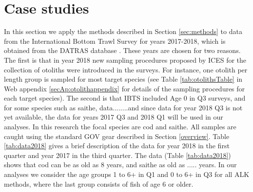 \documentclass[a4paper 12pt]{article}
\numberwithin{equation}{section}
\begin{document}
\section{Case studies}
\label{sec:data}
In this section we apply the methods described in Section \ref{sec:methods} to data from the International Bottom Trawl Survey for years 2017-2018, which is obtained from the DATRAS database \citep{datras}. These years are chosen for two reasons. The first is that in year 2018 new sampling procedures proposed by ICES for the collection of otoliths were introduced in the surveys. For instance, one otolith per length group is sampled for most target species (see Table \ref{tab:otolithsTable} in Web appendix \ref{secAp:otolithappendix} for details of the sampling procedures for each target species). The second is that IBTS included Age 0 in Q3 surveys, and for some species such as saithe, data........and since data for year 2018 Q3 is not yet available, the data for years 2017 Q3 and 2018 Q1 will be used in our analyses. In this research the focal species are cod and saithe. All samples are caught using the standard GOV gear described in Section \ref{overview}. Table \ref{tab:data2018} gives a brief description of the data for year 2018 in the first quarter and year 2017 in the third quarter.  The data (Table \ref{tab:data2018}) shows that cod can be as old as 8 years, and saithe as old as ..... years. In our analyses we consider the age groups 1 to 6+ in Q1 and 0 to 6+ in Q3 for all ALK methods, where the last group consists of fish of age 6 or older. \\
\end{document}
